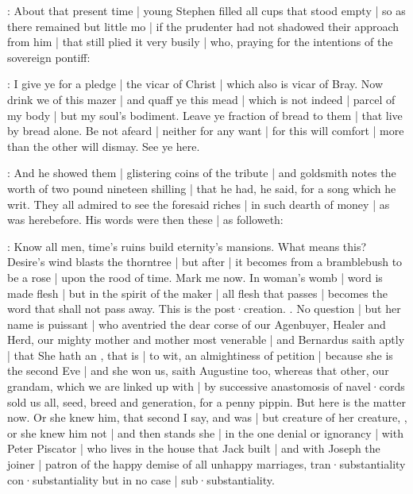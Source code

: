 

:
About that present time |
young Stephen filled all cups that stood empty |
so as there remained but little mo |
if the prudenter had not shadowed their approach from him |
that still plied it very busily |
who, praying for the intentions
of the sovereign pontiff:

\stephen:
I give ye for a pledge |
the vicar of Christ |
which also is vicar of Bray.
Now drink we of this mazer |
and quaff ye this mead |
which is not indeed |
parcel of my body |
but my soul's bodiment.
Leave ye fraction of bread to them |
that live by bread alone.
Be not afeard |
neither for any want |
for this will comfort |
more than the other will dismay.
See ye here.

:
And he showed them |
glistering coins of the tribute |
and goldsmith notes the worth of two pound nineteen shilling |
that he had,
he said,
for a song which he writ.
They all admired to see the foresaid riches |
in such dearth of money |
as was herebefore.
His words were then these |
as followeth:

\stephen:
Know all men,
time's ruins build eternity's mansions.
What means this?
Desire's wind blasts the thorntree |
but after |
it becomes from a bramblebush to be a rose |
upon the rood of time.
Mark me now.
In woman's womb |
word is made flesh |
but in the spirit of the maker |
all flesh that passes |
becomes the word that shall not pass away.
This is the post·creation.
.
No question |
but her name is puissant |
who aventried the dear corse of our Agenbuyer,
Healer and Herd,
our mighty mother and mother most venerable |
and Bernardus saith aptly |
that She hath an ,
that is |
to wit,
an almightiness of petition |
because she is the second Eve |
and she won us,
saith Augustine too,
whereas that other,
our grandam,
which we are linked up with |
by successive anastomosis of navel·cords
sold us all,
seed,
breed and generation,
for a penny pippin.
But here is the matter now.
Or she knew him,
that second I say,
and was |
but creature of her creature,
,
or she knew him not |
and then stands she |
in the one denial or ignorancy |
with Peter Piscator |
who lives in the house that Jack built |
and with Joseph the joiner |
patron of the happy demise of all unhappy marriages,
 tran·substantiality  con·substantiality
but in no case |
sub·substantiality.


